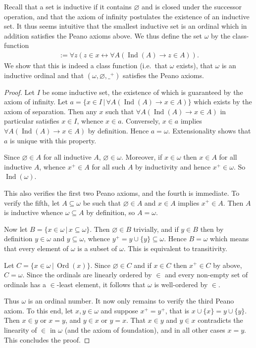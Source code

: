 \documentclass{scrartcl}
\theoremstyle{definition}
\theoremstyle{plain}
\theoremstyle{remark}
\newcommand{\limp}{\rightarrow}
\newcommand{\liff}{\leftrightarrow}
\newcommand{\sep}{\,|\,}
\newcommand{\eqdef}{:=}
\DeclareMathOperator{\Ind}{Ind}
\DeclareMathOperator{\Ord}{Ord}
\begin{document}
Recall that a set is inductive if it contains $\varnothing$ and is closed under the successor operation, and that the axiom of infinity postulates the existence of an inductive set. It thus seems intuitive that the smallest inductive set is an ordinal which in addition satisfies the Peano axioms above. We thus define the set $\omega$ by the class-function
\begin{align*}
  [x = \omega] \eqdef \forall z (z \in x \liff \forall A (\Ind(A) \limp z \in A))\mbox{.}
\end{align*}
We show that this is indeed a class function (i.e.~that $\omega$ exists), that $\omega$ is an inductive ordinal and that $(\omega,\varnothing,{\_}^+)$ satisfies the Peano axioms.
\begin{proof}
  Let $I$ be some inductive set, the existence of which is guaranteed by the axiom of infinity. Let $a = \{x \in I \sep \forall A (\Ind(A) \limp x \in A)\}$ which exists by the axiom of separation. Then any $x$ such that $\forall A (\Ind(A) \limp x \in A)$ in particular satisfies $x \in I$, whence $x \in a$. Conversely, $x \in a$ implies $\forall A (\Ind(A) \limp x \in A)$ by definition. Hence $a = \omega$. Extensionality shows that $a$ is unique with this property.

  Since $\varnothing \in A$ for all inductive $A$, $\varnothing \in \omega$. Moreover, if $x \in \omega$ then $x \in A$ for all inductive $A$, whence $x^+ \in A$ for all such $A$ by inductivity and hence $x^+ \in \omega$. So $\Ind(\omega)$.

  This also verifies the first two Peano axioms, and the fourth is immediate. To verify the fifth, let $A \subseteq \omega$ be such that $\varnothing \in A$ and $x \in A$ implies $x^+ \in A$. Then $A$ is inductive whence $\omega \subseteq A$ by definition, so $A = \omega$.

  Now let $B = \{x \in \omega \sep x \subseteq \omega\}$. Then $\varnothing \in B$ trivially, and if $y \in B$ then by definition $y \in \omega$ and $y \subseteq \omega$, whence $y^+ = y \cup \{y\} \subseteq \omega$. Hence $B = \omega$ which means that every element of $\omega$ is a subset of $\omega$. This is equivalent to transitivity.

  Let $C = \{x \in \omega \sep \Ord(x)\}$. Since $\varnothing \in C$ and if $x \in C$ then $x^+ \in C$ by above, $C= \omega$. Since the ordinals are linearly ordered by $\in$ and every non-empty set of ordinals has a $\in$-least element, it follows that $\omega$ is well-ordered by $\in$.

  Thus $\omega$ is an ordinal number. It now only remains to verify the third Peano axiom. To this end, let $x,y \in \omega$ and suppose $x^+ = y^+$, that is $x \cup \{x\} = y \cup \{y\}$. Then $x \in y$ or $x = y$, and $y \in x$ or $y = x$. That $x \in y$ and $y \in x$ contradicts the linearity of $\in$ in $\omega$ (and the axiom of foundation), and in all other cases $x = y$. This concludes the proof.
\end{proof}
\end{document}
